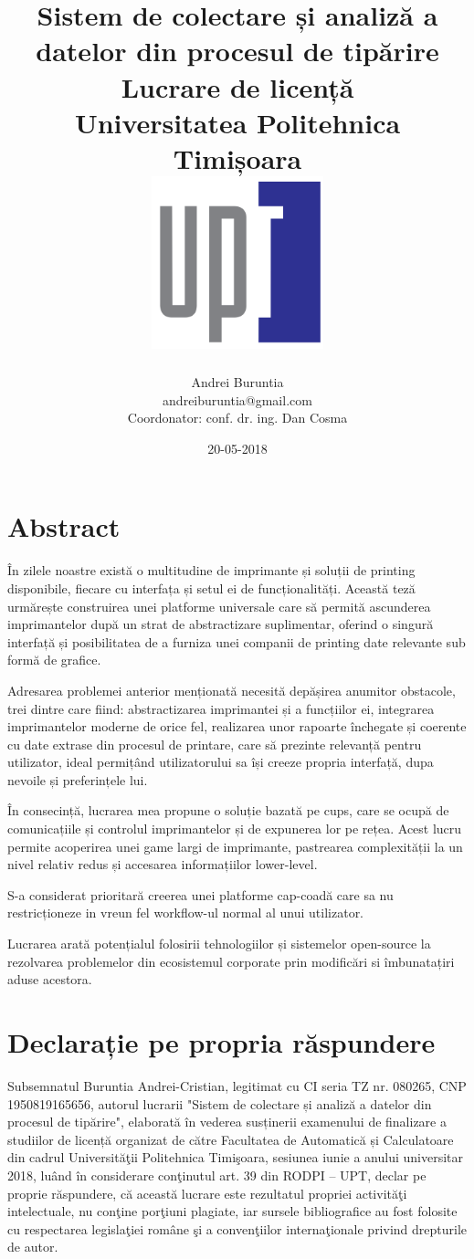 \documentclass[a4paper, 12pt, twoside]{report}
\title{
	{Sistem de colectare și analiză a datelor din procesul de tipărire}\\
	{\large Lucrare de licență}\\
	{\large Universitatea Politehnica Timișoara}\\
	{\includegraphics[width=50mm]{upt_logo.png}}
}
\author{Andrei Buruntia \\ andreiburuntia@gmail.com\\[1cm]{ Coordonator: conf. dr. ing. Dan Cosma}}
\date{20-05-2018}
\begin{document}
\maketitle

\newpage\null\thispagestyle{empty}\newpage

\chapter*{Abstract}
În zilele noastre există o multitudine de imprimante și soluții de printing disponibile, fiecare cu interfața și setul ei de funcționalități. Această teză urmărește construirea unei platforme universale care să permită ascunderea imprimantelor după un strat de abstractizare suplimentar, oferind o singură interfață și posibilitatea de a furniza unei companii de printing date relevante sub formă de grafice.

Adresarea problemei anterior menționată necesită depășirea anumitor obstacole, trei dintre care fiind: abstractizarea imprimantei și a funcțiilor ei, integrarea imprimantelor moderne de orice fel, realizarea unor rapoarte închegate și coerente cu date extrase din procesul de printare, care să prezinte relevanță pentru utilizator, ideal permițând utilizatorului sa își creeze propria interfață, dupa nevoile și preferințele lui.

În consecință, lucrarea mea propune o soluție bazată pe \acrshort{cups}, care se ocupă de comunicațiile și controlul imprimantelor și de expunerea lor pe rețea. Acest lucru permite acoperirea unei game largi de imprimante, pastrearea complexității la un nivel relativ redus și accesarea informațiilor lower-level.

S-a considerat prioritară creerea unei platforme cap-coadă care sa nu restricționeze in vreun fel workflow-ul normal al unui utilizator.

Lucrarea arată potențialul folosirii tehnologiilor și sistemelor open-source la rezolvarea problemelor din ecosistemul corporate prin modificări si îmbunatațiri aduse acestora.

\newpage\null\thispagestyle{empty}\newpage

\chapter*{Declarație pe propria răspundere}
Subsemnatul Buruntia Andrei-Cristian, legitimat cu CI seria TZ nr. 080265, CNP 1950819165656, autorul lucrarii "Sistem de colectare și analiză a datelor din procesul de tipărire", elaborată în vederea susținerii examenului de finalizare a studiilor de licență organizat de către Facultatea de Automatică și Calculatoare din cadrul Universităţii Politehnica Timişoara, sesiunea iunie a anului universitar 2018, luând în considerare conţinutul art. 39 din RODPI – UPT, declar pe proprie răspundere, că această lucrare este rezultatul propriei activităţi intelectuale, nu conţine porţiuni plagiate, iar sursele bibliografice au fost folosite cu respectarea legislaţiei române şi a convenţiilor internaţionale privind drepturile de autor.
\end{document}
